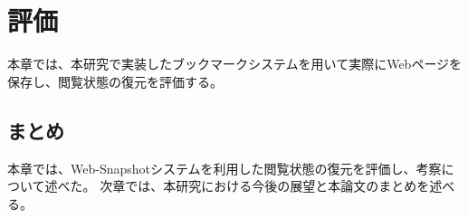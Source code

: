\chapter{評価}
\label{chap:evaluation}
本章では、本研究で実装したブックマークシステムを用いて実際にWebページを保存し、閲覧状態の復元を評価する。






\section{まとめ}
本章では、Web-Snapshotシステムを利用した閲覧状態の復元を評価し、考察について述べた。
次章では、本研究における今後の展望と本論文のまとめを述べる。